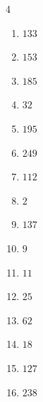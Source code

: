 \begin{multicols}{4}
\begin{enumerate}
  \item $133$


  \item $153$


  \item $185$


  \item $32$


  \item $195$


  \item $249$


\columnbreak %

  \item $112$


  \item $2$


  \item $137$


  \item $9$


  \item $11$


  \item $25$


  \item $62$


  \item $18$


  \item $127$


  \item $238$


\end{enumerate}
\end{multicols}
